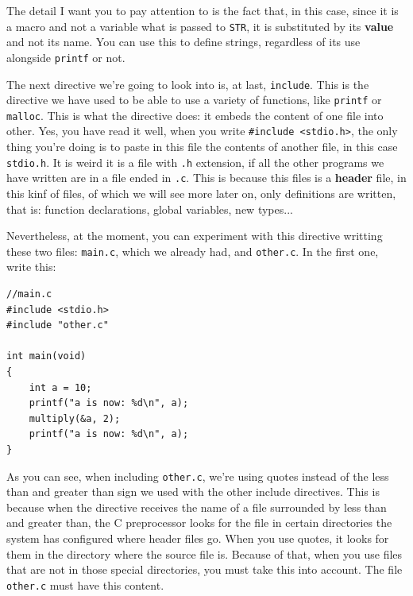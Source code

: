 \documentclass[a4paper]{article}
\begin{document}
The detail I want you to pay attention to is the fact that, in this case, since
it is a macro and not a variable what is passed to \verb!STR!, it is substituted
by its \textbf{value} and not its name. You can use this to define strings,
regardless of its use alongside \verb!printf! or not.

The next directive we're going to look into is, at last, \verb!include!. This is
the directive we have used to be able to use a variety of functions, like
\verb!printf! or \verb!malloc!. This is what the directive does: it embeds the
content of one file into other. Yes, you have read it well, when you write
\verb!#include <stdio.h>!, the only thing you're doing is to paste in this file
the contents of another file, in this case \verb!stdio.h!. It is weird it is a
file with \verb!.h! extension, if all the other programs we have written are
in a file ended in \verb!.c!. This is because this files is a \textbf{header}
file, in this kinf of files, of which we will see more later on, only
definitions are written, that is: function declarations, global variables, new
types...

Nevertheless, at the moment, you can experiment with this directive writting
these two files: \verb!main.c!, which we already had, and \verb!other.c!. In the
first one, write this:

\noindent
\begin{minipage}[H]{\linewidth}
\mbox{}
\begin{lstlisting}[style=C,
caption={Example of \texttt{include} directive, main file},
label={lst:include1}]
//main.c
#include <stdio.h>
#include "other.c"

int main(void)
{
    int a = 10;
    printf("a is now: %d\n", a);
    multiply(&a, 2);
    printf("a is now: %d\n", a);
}
\end{lstlisting}
\end{minipage}

As you can see, when including \verb!other.c!, we're using quotes instead of the
less than and greater than sign we used with the other include directives. This
is because when the directive receives the name of a file surrounded by less
than and greater than, the C preprocessor looks for the file in certain
directories the system has configured where header files go. When you use
quotes, it looks for them in the directory where the source file is. Because of
that, when you use files that are not in those special directories, you must
take this into account. The file \verb!other.c! must have this content.
\end{document}
